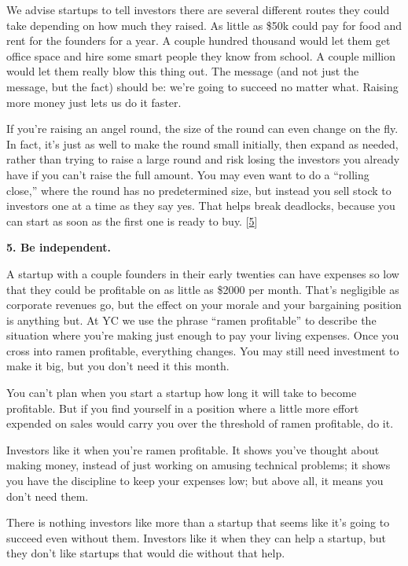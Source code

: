 We advise startups to tell investors there are several different routes
they could take depending on how much they raised. As little as \$50k
could pay for food and rent for the founders for a year. A couple
hundred thousand would let them get office space and hire some smart
people they know from school. A couple million would let them really
blow this thing out. The message (and not just the message, but the
fact) should be: we're going to succeed no matter what. Raising more
money just lets us do it faster.

If you're raising an angel round, the size of the round can even change
on the fly. In fact, it's just as well to make the round small
initially, then expand as needed, rather than trying to raise a large
round and risk losing the investors you already have if you can't raise
the full amount. You may even want to do a ``rolling close,'' where the
round has no predetermined size, but instead you sell stock to investors
one at a time as they say yes. That helps break deadlocks, because you
can start as soon as the first one is ready to buy.
{[}\hyperref[f5n]{5}{]}

\textbf{5. Be independent.}

A startup with a couple founders in their early twenties can have
expenses so low that they could be profitable on as little as \$2000 per
month. That's negligible as corporate revenues go, but the effect on
your morale and your bargaining position is anything but. At YC we use
the phrase ``ramen profitable'' to describe the situation where you're
making just enough to pay your living expenses. Once you cross into
ramen profitable, everything changes. You may still need investment to
make it big, but you don't need it this month.

You can't plan when you start a startup how long it will take to become
profitable. But if you find yourself in a position where a little more
effort expended on sales would carry you over the threshold of ramen
profitable, do it.

Investors like it when you're ramen profitable. It shows you've thought
about making money, instead of just working on amusing technical
problems; it shows you have the discipline to keep your expenses low;
but above all, it means you don't need them.

There is nothing investors like more than a startup that seems like it's
going to succeed even without them. Investors like it when they can help
a startup, but they don't like startups that would die without that
help.

